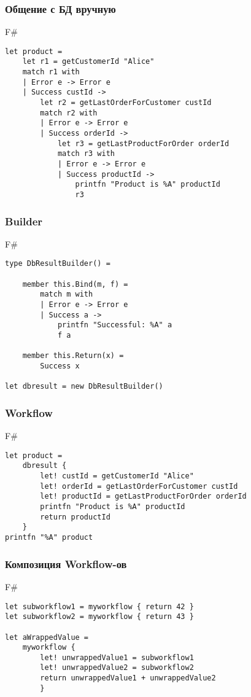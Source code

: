 \documentclass[xetex,mathserif,serif]{beamer}
\begin{document}
	\begin{frame}[fragile]
		\frametitle{Общение с БД вручную}
   		\begin{exampleblock}{F\#}
   			\begin{lstlisting}
let product = 
    let r1 = getCustomerId "Alice"
    match r1 with 
    | Error e -> Error e
    | Success custId ->
        let r2 = getLastOrderForCustomer custId 
        match r2 with 
        | Error e -> Error e
        | Success orderId ->
            let r3 = getLastProductForOrder orderId 
            match r3 with 
            | Error e -> Error e
            | Success productId ->
                printfn "Product is %A" productId
                r3
\end{lstlisting}
\end{exampleblock}
\end{frame}

	\begin{frame}[fragile]
		\frametitle{Builder}
   		\begin{exampleblock}{F\#}
   			\begin{lstlisting}
type DbResultBuilder() =

    member this.Bind(m, f) = 
        match m with
        | Error e -> Error e
        | Success a -> 
            printfn "Successful: %A" a
            f a

    member this.Return(x) = 
        Success x

let dbresult = new DbResultBuilder()
\end{lstlisting}
\end{exampleblock}
\end{frame}

	\begin{frame}[fragile]
		\frametitle{Workflow}
   		\begin{exampleblock}{F\#}
   			\begin{lstlisting}
let product = 
    dbresult {
        let! custId = getCustomerId "Alice"
        let! orderId = getLastOrderForCustomer custId
        let! productId = getLastProductForOrder orderId 
        printfn "Product is %A" productId
        return productId
    }
printfn "%A" product
\end{lstlisting}
\end{exampleblock}
\end{frame}

	\begin{frame}[fragile]
		\frametitle{Композиция Workflow-ов}
   		\begin{exampleblock}{F\#}
   			\begin{lstlisting}
let subworkflow1 = myworkflow { return 42 }
let subworkflow2 = myworkflow { return 43 }

let aWrappedValue = 
    myworkflow {
        let! unwrappedValue1 = subworkflow1
        let! unwrappedValue2 = subworkflow2
        return unwrappedValue1 + unwrappedValue2
        }
\end{lstlisting}
\end{exampleblock}
\end{frame}
\end{document}
